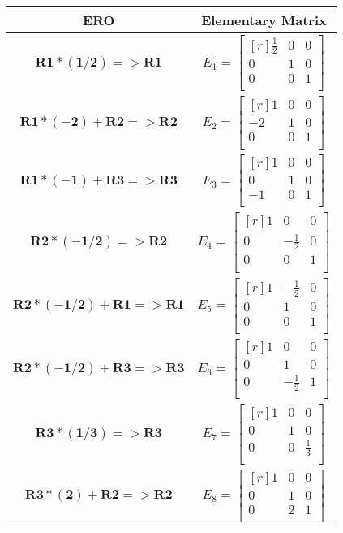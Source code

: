 \documentclass[12pt]{article}
\begin{document}
\begin{center}
\begin{tabular}{|c|c|}\hline
\textbf{ERO} & \textbf{Elementary Matrix}\\\hline
$\mathbf{R1*(1/2)=>R1}$     & $E_1=\begin{bmatrix*}[r]\frac{1}{2}&0&0\\0&1&0\\0&0&1\\\end{bmatrix*}$\\\hline
$\mathbf{R1*(-2)+R2=>R2}$   & $E_2=\begin{bmatrix*}[r]1&0&0\\-2&1&0\\0&0&1\\\end{bmatrix*}$\\\hline
$\mathbf{R1*(-1)+R3=>R3}$   & $E_3=\begin{bmatrix*}[r]1&0&0\\0&1&0\\-1&0&1\\\end{bmatrix*}$\\\hline
$\mathbf{R2*(-1/2)=>R2}$    & $E_4=\begin{bmatrix*}[r]1&0&0\\0&-\frac{1}{2}&0\\0&0&1\\\end{bmatrix*}$\\\hline
$\mathbf{R2*(-1/2)+R1=>R1}$ & $E_5=\begin{bmatrix*}[r]1&-\frac{1}{2}&0\\0&1&0\\0&0&1\\\end{bmatrix*}$\\\hline
$\mathbf{R2*(-1/2)+R3=>R3}$ & $E_6=\begin{bmatrix*}[r]1&0&0\\0&1&0\\0&-\frac{1}{2}&1\\\end{bmatrix*}$\\\hline
$\mathbf{R3*(1/3)=>R3}$     & $E_7=\begin{bmatrix*}[r]1&0&0\\0&1&0\\0&0&\frac{1}{3}\\\end{bmatrix*}$\\\hline
$\mathbf{R3*(2)+R2=>R2}$    & $E_8=\begin{bmatrix*}[r]1&0&0\\0&1&0\\0&2&1\\\end{bmatrix*}$\\\hline
\end{tabular}
\end{center}
\end{document}
